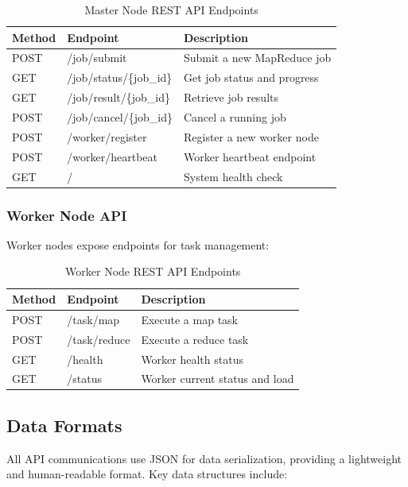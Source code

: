 \documentclass[11pt,letterpaper,oneside]{article}
\begin{document}
\begin{table}[htbp]
\centering
\caption[Master Node API Endpoints]{Master Node REST API Endpoints}
\label{table:master-api}
\begin{tabular}{|l|l|p{6cm}|}
\hline
\textbf{Method} & \textbf{Endpoint} & \textbf{Description} \\
\hline
POST & /job/submit & Submit a new MapReduce job \\
GET & /job/status/\{job\_id\} & Get job status and progress \\
GET & /job/result/\{job\_id\} & Retrieve job results \\
POST & /job/cancel/\{job\_id\} & Cancel a running job \\
POST & /worker/register & Register a new worker node \\
POST & /worker/heartbeat & Worker heartbeat endpoint \\
GET & / & System health check \\
\hline
\end{tabular}
\end{table}

\subsubsection{Worker Node API}

Worker nodes expose endpoints for task management:

\begin{table}[htbp]
\centering
\caption[Worker Node API Endpoints]{Worker Node REST API Endpoints}
\label{table:worker-api}
\begin{tabular}{|l|l|p{6cm}|}
\hline
\textbf{Method} & \textbf{Endpoint} & \textbf{Description} \\
\hline
POST & /task/map & Execute a map task \\
POST & /task/reduce & Execute a reduce task \\
GET & /health & Worker health status \\
GET & /status & Worker current status and load \\
\hline
\end{tabular}
\end{table}

\subsection{Data Formats}

All API communications use JSON for data serialization, providing a lightweight and human-readable format. Key data structures include:
\end{document}
